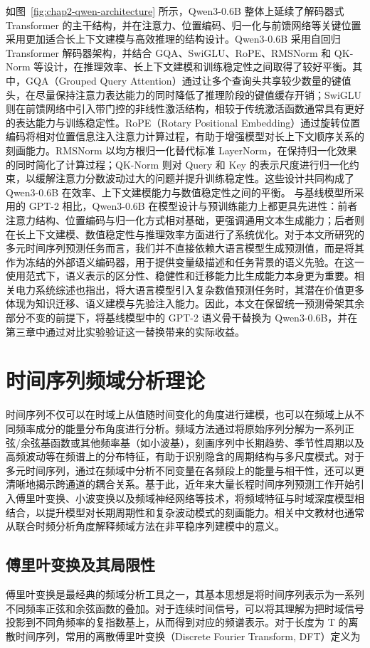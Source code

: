 \begin{figure}[htbp]
\end{figure} 如图~\ref{fig:chap2-qwen-architecture} 所示，Qwen3-0.6B 整体上延续了解码器式 Transformer 的主干结构，并在注意力、位置编码、归一化与前馈网络等关键位置采用更加适合长上下文建模与高效推理的结构设计。Qwen3-0.6B 采用自回归 Transformer 解码器架构，并结合 GQA、SwiGLU、RoPE、RMSNorm 和 QK-Norm 等设计，在推理效率、长上下文建模和训练稳定性之间取得了较好平衡。其中，GQA（Grouped Query Attention）通过让多个查询头共享较少数量的键值头，在尽量保持注意力表达能力的同时降低了推理阶段的键值缓存开销\cite{ainslie2023gqa}；SwiGLU 则在前馈网络中引入带门控的非线性激活结构，相较于传统激活函数通常具有更好的表达能力与训练稳定性\cite{shazeer2020glu}。RoPE（Rotary Positional Embedding）通过旋转位置编码将相对位置信息注入注意力计算过程，有助于增强模型对长上下文顺序关系的刻画能力\cite{su2021roformer}。RMSNorm 以均方根归一化替代标准 LayerNorm，在保持归一化效果的同时简化了计算过程\cite{zhang2019rmsnorm}；QK-Norm 则对 Query 和 Key 的表示尺度进行归一化约束，以缓解注意力分数波动过大的问题并提升训练稳定性\cite{henry2020qknorm}。这些设计共同构成了 Qwen3-0.6B 在效率、上下文建模能力与数值稳定性之间的平衡。 与基线模型所采用的 GPT-2 相比，Qwen3-0.6B 在模型设计与预训练能力上都更具先进性：前者注意力结构、位置编码与归一化方式相对基础，更强调通用文本生成能力；后者则在长上下文建模、数值稳定性与推理效率方面进行了系统优化。对于本文所研究的多元时间序列预测任务而言，我们并不直接依赖大语言模型生成预测值，而是将其作为冻结的外部语义编码器，用于提供变量级描述和任务背景的语义先验。在这一使用范式下，语义表示的区分性、稳健性和迁移能力比生成能力本身更为重要。相关电力系统综述也指出，将大语言模型引入复杂数值预测任务时，其潜在价值更多体现为知识迁移、语义建模与先验注入能力。因此，本文在保留统一预测骨架其余部分不变的前提下，将基线模型中的 GPT-2 语义骨干替换为 Qwen3-0.6B，并在第三章中通过对比实验验证这一替换带来的实际收益。 \section{时间序列频域分析理论} 时间序列不仅可以在时域上从值随时间变化的角度进行建模，也可以在频域上从不同频率成分的能量分布角度进行分析。频域方法通过将原始序列分解为一系列正弦/余弦基函数或其他频率基（如小波基），刻画序列中长期趋势、季节性周期以及高频波动等在频谱上的分布特征，有助于识别隐含的周期结构与多尺度模式。对于多元时间序列，通过在频域中分析不同变量在各频段上的能量与相干性，还可以更清晰地揭示跨通道的耦合关系。基于此，近年来大量长程时间序列预测工作开始引入傅里叶变换、小波变换以及频域神经网络等技术，将频域特征与时域深度模型相结合，以提升模型对长期周期性和复杂波动模式的刻画能力\cite{mallat1989wavelet}。相关中文教材也通常从联合时频分析角度解释频域方法在非平稳序列建模中的意义\cite{tang2016timefreqwavelet}。 \subsection{傅里叶变换及其局限性} 傅里叶变换是最经典的频域分析工具之一，其基本思想是将时间序列表示为一系列不同频率正弦和余弦函数的叠加。对于连续时间信号，可以将其理解为把时域信号投影到不同角频率的复指数基上，从而得到对应的频谱表示。对于长度为 T 的离散时间序列，常用的离散傅里叶变换（Discrete Fourier Transform, DFT）定义为 \begin{equation}

\end{equation}
